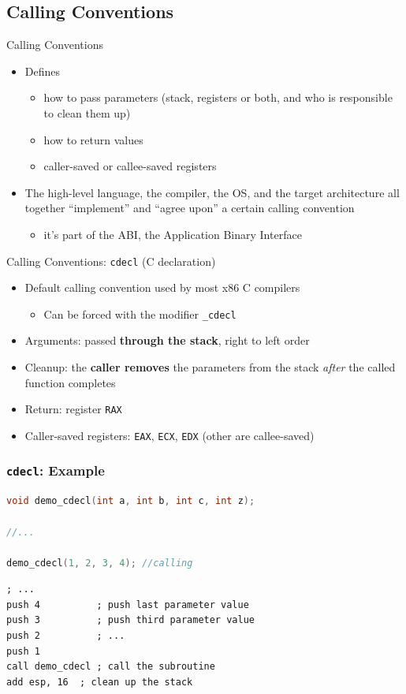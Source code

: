 \documentclass[]{beamer}
\begin{document}
\subsection{Calling Conventions}

\begin{frame}{Calling Conventions}
  \begin{itemize}
  	\item Defines
		\begin{itemize}
		\item how to pass parameters (stack, registers or both, and who is responsible to clean them up)
		\item how to return values
		\item caller-saved or callee-saved registers
		\end{itemize}
	\item The high-level language, the compiler, the OS, and the target architecture all together ``implement'' and ``agree upon'' a certain calling convention
    \begin{itemize}
    	\item it's part of the \alert{ABI}, the Application Binary Interface
    \end{itemize}
 \end{itemize}
\end{frame}


\begin{frame}{Calling Conventions: {\tt cdecl} (C declaration)}
  \begin{itemize}
  \item Default calling convention used by most x86 C compilers
  \begin{itemize}
  	\item Can be forced with the modifier \alert{\tt \_cdecl}
  \end{itemize}
  \item Arguments: passed \textbf{through the stack}, right to left order
  \item Cleanup: the \textbf{caller removes} the parameters from the stack \emph{after} the called function completes
  \item Return: register {\tt RAX}
  \item Caller-saved registers: {\tt EAX}, {\tt ECX}, {\tt EDX} (other are callee-saved)
  \end{itemize}
\end{frame}
\begin{frame}[fragile]
  \frametitle{{\tt cdecl}: Example}
\begin{lstlisting}[language=C]
void demo_cdecl(int a, int b, int c, int z);

//...

demo_cdecl(1, 2, 3, 4); //calling
\end{lstlisting}

\begin{lstlisting}[language={[x86masm]Assembler}]
; ...
push 4          ; push last parameter value
push 3          ; push third parameter value
push 2          ; ...
push 1
call demo_cdecl ; call the subroutine
add esp, 16  ; clean up the stack
\end{lstlisting}

\end{frame}
\end{document}
